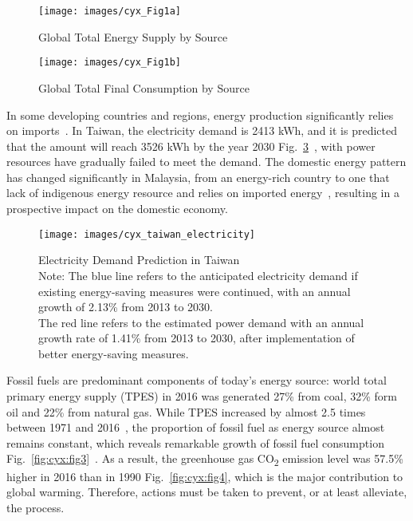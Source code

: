 \documentclass[letterpaper, twocolumn, 10pt, conference]{IEEEtran}
\begin{document}
\begin{figure}[h!]
        \centering
        \texttt{[image: images/cyx\_Fig1a]}
        \caption{Global Total Energy Supply by Source}
        \label{fig:cyx:fig1a}
\end{figure}

\begin{figure}[h!]
        \centering
        \texttt{[image: images/cyx\_Fig1b]}
        \caption{Global Total Final Consumption by Source}
        \label{fig:cyx:fig1b}
\end{figure}

In some developing countries and regions, energy production significantly relies on imports~\cite{fakharuddin2012smart}. In Taiwan, the electricity demand is 2413 kWh, and it is predicted that the amount will reach 3526 kWh by the year 2030 Fig.~\ref{fig:cyx:fig2}~\cite{energy-2014}, with power resources have gradually failed to meet the demand. The domestic energy pattern has changed significantly in Malaysia, from an energy-rich country to one that lack of indigenous energy resource and relies on imported energy~\cite{fakharuddin2012smart}, resulting in a prospective impact on the domestic economy.

\begin{figure}[h!]
       \centering
       \texttt{[image: images/cyx\_taiwan\_electricity]}
       \caption{Electricity Demand Prediction in Taiwan\\
		Note: The blue line refers to the anticipated electricity demand if existing energy-saving measures were continued, with an annual growth of 2.13\% from 2013 to 2030. \\
		The red line refers to the estimated power demand with an annual growth rate of 1.41\% from 2013 to 2030, after implementation of better energy-saving measures.}

       \label{fig:cyx:fig2}
\end{figure}

Fossil fuels are predominant components of today’s energy source: world total primary energy supply (TPES) in 2016 was generated 27\% from coal, 32\% form oil and 22\% from natural gas. While TPES increased by almost 2.5 times between 1971 and 2016~\cite{/content/publication/world_energy_bal-2018-en}, the proportion of fossil fuel as energy source almost remains constant, which reveals remarkable growth of fossil fuel consumption Fig.~\ref{fig:cyx:fig3}~\cite{statistics2017key}. As a result, the greenhouse gas CO\textsubscript{2} emission level was 57.5\% higher in 2016 than in 1990 Fig.~\ref{fig:cyx:fig4}, which is the major contribution to global warming. Therefore, actions must be taken to prevent, or at least alleviate, the process.
\end{document}
